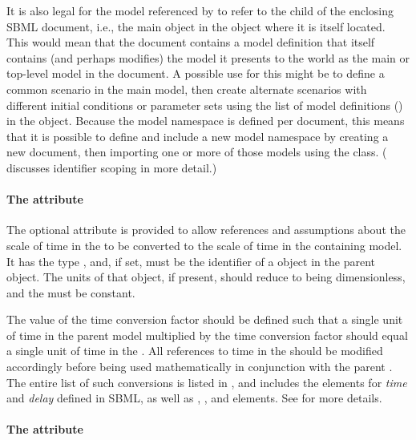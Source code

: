 It is also legal for the model referenced by  to refer
to the  child of the enclosing SBML document, i.e., the
main \Model object in the \SBML object where it is itself located.  This
would mean that the document contains a model definition that itself
contains (and perhaps modifies) the model it presents to the world as
the main or top-level model in the document.  A possible use for this
might be to define a common scenario in the main model, then create
alternate scenarios with different initial conditions or parameter sets
using the list of model definitions () in the
\SBML object.  Because the model namespace is defined per document, this
means that it is possible to define and include a new model namespace by
creating a new document, then importing one or more of those models
using the \ExternalModelDefinition class.  ( discusses
identifier scoping in more detail.)


\paragraph{The \fixttspace{} attribute}
\label{submodel-timeconversionfactor}

The optional  attribute is provided to allow
references and assumptions about the scale of time in the \Submodel to be converted to 
the scale of time in the containing model.  It has the type ,
and, if set, must be the identifier of a \Parameter object in the 
parent \Model object.  The units of that \Parameter object, if present,
should reduce to being dimensionless, and the \Parameter must be constant.

The value of the time conversion factor should be defined such that a
single unit of time in the parent model multiplied by the time
conversion factor should equal a single unit of time in the \Submodel.
All references to time in the \Submodel should be modified accordingly
before being used mathematically in conjunction with the parent \Model.
The entire list of such \sbmlthreecore conversions is listed in
, and includes the  elements for
\emph{time} and \emph{delay} defined in SBML, as well as \Delay,
\RateRule, and \KineticLaw elements.  See  for
more details.


\paragraph{The \fixttspace{} attribute}
\label{submodel-extentconversionfactor}

